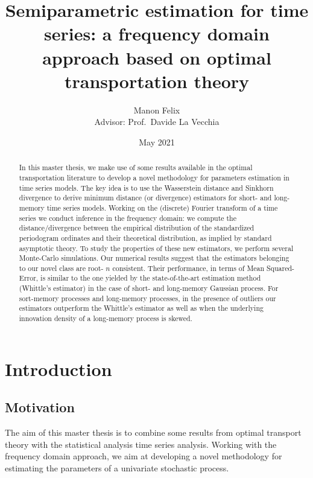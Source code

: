 \documentclass[
  11pt,
]{article}
\title{Semiparametric estimation for time series: a frequency domain
approach based on optimal transportation theory}
\author{Manon Felix\\
Advisor: Prof.~Davide La Vecchia}
\date{May 2021}
\begin{document}
\maketitle
\begin{abstract}
In this master thesis, we make use of some results available in the
optimal transportation literature to develop a novel methodology for
parameters estimation in time series models. The key idea is to use the
Wasserstein distance and Sinkhorn divergence to derive minimum distance
(or divergence) estimators for short- and long-memory time series
models. Working on the (discrete) Fourier transform of a time series we
conduct inference in the frequency domain: we compute the
distance/divergence between the empirical distribution of the
standardized periodogram ordinates and their theoretical distribution,
as implied by standard asymptotic theory. To study the properties of
these new estimators, we perform several Monte-Carlo simulations. Our
numerical results suggest that the estimators belonging to our novel
class are root- \(n\) consistent. Their performance, in terms of Mean
Squared-Error, is similar to the one yielded by the state-of-the-art
estimation method (Whittle's estimator) in the case of short- and
long-memory Gaussian process. For sort-memory processes and long-memory
processes, in the presence of outliers our estimators outperform the
Whittle's estimator as well as when the underlying innovation density of
a long-memory process is skewed.
\end{abstract}

\newpage

\tableofcontents

\newpage

\hypertarget{introduction}{%
\section{Introduction}\label{introduction}}

\hypertarget{motivation}{%
\subsection{Motivation}\label{motivation}}

The aim of this master thesis is to combine some results from optimal
transport theory with the statistical analysis time series analysis.
Working with the frequency domain approach, we aim at developing a novel
methodology for estimating the parameters of a univariate stochastic
process.
\end{document}

